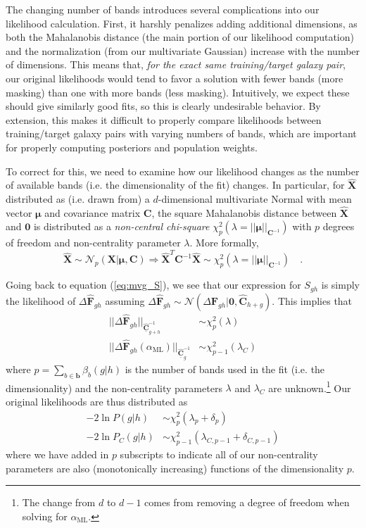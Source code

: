 \documentclass[a4paper,fleqn,usenatbib,english]{mnras}
\newcommand{\rom}[2]{\ensuremath{#1_{\mathrm{#2}}}} %
\begin{document}
The changing number of bands introduces several complications into our likelihood calculation. First, it harshly penalizes adding additional dimensions, as both the Mahalanobis distance (the main portion of our likelihood computation) and the normalization (from our multivariate Gaussian) increase with the number of dimensions. This means that, \textit{for the exact same training/target galaxy pair}, our original likelihoods would tend to favor a solution with fewer bands (more masking) than one with more bands (less masking). Intuitively, we expect these should give similarly good fits, so this is clearly undesirable behavior. By extension, this makes it difficult to properly compare likelihoods between training/target galaxy pairs with varying numbers of bands, which are important for properly computing posteriors and population weights.

To correct for this, we need to examine how our likelihood changes as the number of available bands (i.e. the dimensionality of the fit) changes. In particular, for $\mathbf{\hat{X}}$ distributed as (i.e. drawn from) a $d$-dimensional multivariate Normal with mean vector $\boldsymbol{\mu}$ and covariance matrix $\mathbf{C}$, the square Mahalanobis distance between $\mathbf{\hat{X}}$ and $\mathbf{0}$ is distributed as a \textit{non-central chi-square} $\chi^2_p(\lambda=||\boldsymbol{\mu}||_{\mathbf{C}^{-1}})$ with $p$ degrees of freedom and non-centrality parameter $\lambda$. More formally,
\begin{equation}
\mathbf{\hat{X}} \sim \mathcal{N}_{p}(\mathbf{X}|\boldsymbol{\mu},\mathbf{C}) \Rightarrow
\mathbf{\hat{X}}^T\mathbf{C}^{-1}\mathbf{\hat{X}} \sim \chi^2_p(\lambda=||\boldsymbol{\mu}||_{\mathbf{C}^{-1}}) \quad .
\end{equation}

Going back to equation (\ref{eq:mvg_S}), we see that our expression for $S_{gh}$ is simply the likelihood of $\Delta\mathbf{\hat{F}}_{gh}$ assuming $\Delta\mathbf{\hat{F}}_{gh} \sim \mathcal{N}(\Delta\mathbf{F}_{gh}|\mathbf{0},\mathbf{\hat{C}}_{h+g})$. This implies that
\begin{align}
||\Delta\mathbf{\hat{F}}_{gh}||_{\underline{\mathbf{\hat{C}}}_{g+h}^{-1}} &\sim \chi^2_p(\lambda) \\
||\Delta\mathbf{\hat{F}}_{gh}(\rom{\alpha}{ML})||_{\underline{\mathbf{\hat{C}}}_g^{-1}} &\sim \chi^2_{p-1}(\lambda_C)
\end{align}
where $p=\sum_{b\in\mathbf{b}}\beta_b(g|h)$ is the number of bands used in the fit (i.e. the dimensionality) and the non-centrality parameters $\lambda$ and $\lambda_C$ are unknown.\footnote{The change from $d$ to $d-1$ comes from removing a degree of freedom when solving for $\rom{\alpha}{ML}$.} Our original likelihoods are thus distributed as
\begin{align}
-2\ln P(g|h) &\sim \chi^2_p(\lambda_p + \delta_p) \\
-2 \ln P_C(g|h) &\sim \chi^2_{p-1}(\lambda_{C,p-1} + \delta_{C,p-1})
\end{align}
where we have added in $p$ subscripts to indicate all of our non-centrality parameters are also (monotonically increasing) functions of the dimensionality $p$.
\end{document}
